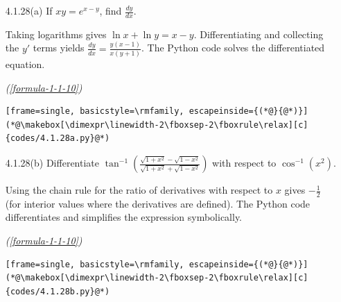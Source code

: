 \begin{enumerate}[label={},font=\normalfont,leftmargin=1.15cm,labelwidth=1.0cm,labelsep=0.15cm,itemindent=0pt,listparindent=0pt,itemsep=\baselineskip,parsep=0pt,topsep=0pt]
\vspace{0.6em}\par\solution


Direct matrix multiplication gives $A^2=\begin{bmatrix}11&14&0\\7&18&0\\0&0&25\end{bmatrix}$. Hence
\begin{equation*}
A^2-7A+10I=\boxed{\begin{bmatrix}0&0&0\\0&0&0\\0&0&0\end{bmatrix}}.
\tag*{(\ref{formula-1-1-1})}\end{equation*}
The Python code carries out the matrix operation.
\begin{lstlisting}[frame=single, basicstyle=\rmfamily, escapeinside={(*@}{@*)}]
(*@\makebox[\dimexpr\linewidth-2\fboxsep-2\fboxrule\relax][c]{codes/4.1.27.py}@*)
\end{lstlisting}

\item[4.1.28(a)] If $xy=e^{x-y}$, find $\frac{dy}{dx}$.

\vspace{0.6em}\par\solution


Taking logarithms gives $\ln x+\ln y=x-y$. Differentiating and collecting the $y'$ terms yields $\boxed{\frac{dy}{dx}=\frac{y(x-1)}{x(y+1)}}$. The Python code solves the differentiated equation.
\par\noindent\hfill\mbox{\textit{(\ref{formula-1-1-10})}}\par\begin{lstlisting}[frame=single, basicstyle=\rmfamily, escapeinside={(*@}{@*)}]
(*@\makebox[\dimexpr\linewidth-2\fboxsep-2\fboxrule\relax][c]{codes/4.1.28a.py}@*)
\end{lstlisting}

\item[4.1.28(b)] Differentiate $\tan^{-1}\!\left(\frac{\sqrt{1+x^2}-\sqrt{1-x^2}}{\sqrt{1+x^2}+\sqrt{1-x^2}}\right)$ with respect to $\cos^{-1}(x^2)$.

\vspace{0.6em}\par\solution


Using the chain rule for the ratio of derivatives with respect to $x$ gives $\boxed{-\frac12}$ (for interior values where the derivatives are defined). The Python code differentiates and simplifies the expression symbolically.
\par\noindent\hfill\mbox{\textit{(\ref{formula-1-1-10})}}\par\begin{lstlisting}[frame=single, basicstyle=\rmfamily, escapeinside={(*@}{@*)}]
(*@\makebox[\dimexpr\linewidth-2\fboxsep-2\fboxrule\relax][c]{codes/4.1.28b.py}@*)
\end{lstlisting}


\end{enumerate}
